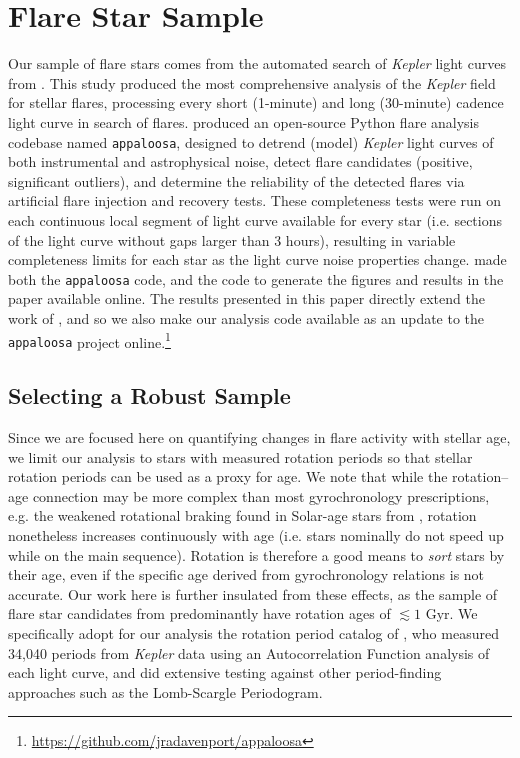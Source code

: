 \documentclass[preprint2]{aastex62}
\newcommand{\Kepler}{\textsl{Kepler}\xspace}
\begin{document}
\section{Flare Star Sample}
\label{sec:sample}

Our sample of flare stars comes from the automated search of \Kepler light curves from \citet{davenport2016}. This study produced the most comprehensive analysis of the \Kepler field for stellar flares, processing every short (1-minute) and long (30-minute) cadence light curve in search of flares. \citet{davenport2016} produced an open-source Python flare analysis codebase named {\tt appaloosa}, designed to detrend (model) \Kepler light curves of both instrumental and astrophysical noise, detect flare candidates (positive, significant outliers), and determine the reliability of the detected flares via artificial flare injection and recovery tests. These completeness tests were run on each continuous local segment of light curve available for every star (i.e. sections of the light curve without gaps larger than 3 hours), resulting in variable completeness limits for each star as the light curve noise properties change. \citet{davenport2016} made both the {\tt appaloosa} code, and the code to generate the figures and results in the paper available online. The results presented in this paper directly extend the work of \citet{davenport2016}, and so we also make our analysis code available as an update to the {\tt appaloosa} project online.\footnote{\url{https://github.com/jradavenport/appaloosa}}


\subsection{Selecting a Robust Sample}
Since we are focused here on quantifying changes in flare activity with stellar age, we limit our analysis to stars with measured rotation periods so that stellar rotation periods can be used as a proxy for age. We note that while the rotation--age connection may be more complex than most gyrochronology prescriptions, e.g. the weakened rotational braking found in Solar-age stars from \citet{van-saders2016}, rotation nonetheless increases continuously with age (i.e. stars nominally do not speed up while on the main sequence). Rotation is therefore a good means to {\it sort} stars by their age, even if the specific age derived from gyrochronology relations is not accurate. Our work here is further insulated from these effects, as the sample of flare star candidates from \citet{davenport2016} predominantly have rotation ages of $\lesssim 1$ Gyr. We specifically adopt for our analysis the rotation period catalog of \citet{mcquillan2014}, who measured 34,040 periods from \Kepler data using an Autocorrelation Function analysis of each light curve, and did extensive testing against other period-finding approaches such as the Lomb-Scargle Periodogram. 
\end{document}
